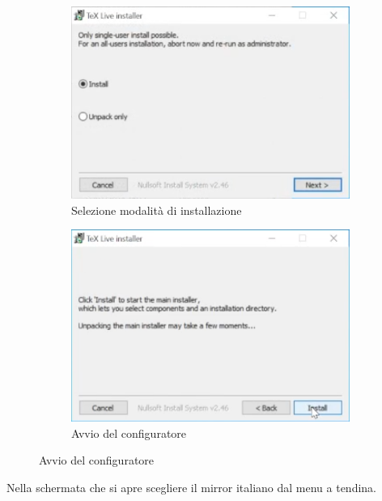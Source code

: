\documentclass[envcountsame,envcountchap]{svmono}
\begin{document}
\begin{figure}[H]
    \begin{subfigure}{0.49\textwidth}
        \centering
        \includegraphics[width=\linewidth]{images/texlive/win/3_install_mode.png}
        \caption{Selezione modalità di installazione}
        \label{texlive_install_mode}
    \end{subfigure}
    \begin{subfigure}{0.49\textwidth}
        \centering
        \includegraphics[width=\linewidth]{images/texlive/win/4_start_installer.png}
        \caption{Avvio del configuratore}
        \label{texlive_config}
    \end{subfigure}
\end{figure}
Nella schermata che si apre scegliere il mirror italiano dal menu a tendina.
\end{document}
